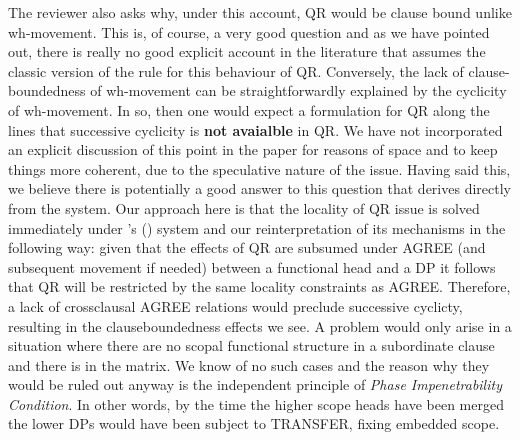 \documentclass[11pt]{article}
\newcommand{\citeposs}[1]{\citeauthor{#1}'s (\citeyear{#1})}
\begin{document}
The reviewer also asks why, under this account, QR would be clause bound unlike wh-movement. This is, of course, a very good question and as we have pointed out, there is really no good explicit account in the literature that assumes the classic version of the rule for this behaviour of QR. Conversely, the lack of clause-boundedness of wh-movement can be straightforwardly explained by the cyclicity of wh-movement. In so, then one would expect a formulation for QR along the lines that successive cyclicity is \textbf{not avaialble} in QR. We have not incorporated an explicit discussion of this point in the paper for reasons of space and to keep things more coherent, due to the speculative nature of the issue. Having said this, we believe there is potentially a good answer to this question that derives directly from the system. Our approach here is that the locality of QR issue is solved immediately under \citeposs{Beghelli-Stowell:97} system and our reinterpretation of its mechanisms in the following way: given that the effects of QR are subsumed under AGREE (and subsequent movement if needed) between a functional head and a DP it follows that QR will be restricted by the same locality constraints as AGREE. Therefore, a lack of crossclausal AGREE relations would preclude successive cyclicty, resulting in the clauseboundedness effects we see. A problem would only arise in a situation where there are no scopal functional structure in a subordinate clause and there is in the matrix.  We know of no such cases and the reason why they would be ruled out anyway is the independent principle of \textit{Phase Impenetrability Condition}.  In other words, by the time the higher scope heads have been merged the lower DPs would have been subject to TRANSFER, fixing embedded scope.


\end{document}
